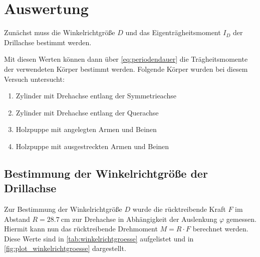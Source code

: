\section{Auswertung}
\label{sec:Auswertung}



Zunächst muss die Winkelrichtgröße $D$ und das Eigenträgheitsmoment $I_D$ der Drillachse bestimmt werden.

Mit diesen Werten können dann über \autoref{eq:periodendauer} die Trägheitsmomente der verwendeten Körper bestimmt werden. Folgende Körper wurden bei diesem Versuch untersucht:
\begin{enumerate}
    \item Zylinder mit Drehachse entlang der Symmetrieachse
    \item Zylinder mit Drehachse entlang der Querachse
    \item Holzpuppe mit angelegten Armen und Beinen
    \item Holzpuppe mit ausgestreckten Armen und Beinen
\end{enumerate}

\subsection{Bestimmung der Winkelrichtgröße der Drillachse}
\label{sec:winkelrichtgroesse}

Zur Bestimmung der Winkelrichtgröße $D$ wurde die rücktreibende Kraft $F$ im Abstand $R=\SI{28.7}{\centi\meter}$ zur Drehachse in Abhängigkeit der Auslenkung $\varphi$ gemessen. Hiermit kann nun das rücktreibende Drehmoment $M=R \cdot F$ berechnet werden. Diese Werte sind in \autoref{tab:winkelrichtgroesse} aufgelistet und in \autoref{fig:plot_winkelrichtgroesse} dargestellt.

